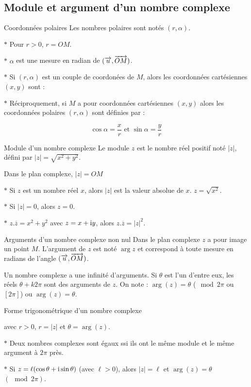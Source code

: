 \subsection{Module et argument d'un nombre complexe}

\begin{bclogo}{Coordonnées polaires}
Les nombres polaires sont notés $(r,\alpha)$. 

$\ast$ Pour $r>0$, $r=OM$.

$\ast$ $\alpha$ est une mesure en radian de $(\overrightarrow{u},\overrightarrow{OM})$.

$\ast$ Si $(r,\alpha)$ est un couple de coordonées de $M$, alors les coordonnées cartésiennes $(x,y)$ sont : 

$\ast$ Réciproquement, si $M$ a pour coordonnées cartésiennes $(x,y)$ alors les coordonnées polaires $(r,\alpha)$ sont définies par : 

\[\cos \alpha=\frac{x}{r} \text{ et } \sin \alpha=\frac{y}{r}\]
\end{bclogo}

\medskip

\begin{bclogo}{Module d'un nombre complexe}
Le module $z$ est le nombre réel positif noté $|z|$, défini par $|z|=\sqrt{x^2+y^2}$.

Dans le plan complexe, $|z|=OM$

$\ast$ Si $z$ est un nombre réel $x$, alors $|z|$ est la valeur absolue de $x$. $z=\sqrt{x^2}$.

$\ast$ Si $|z|=0$, alors $z=0$.

$\ast$ $z.\overline{z}=x^2+y^2$ avec $z=x+\mathrm{i} y$, alors $z.\overline{z}=|z|^2$.
\end{bclogo}

\medskip

\begin{bclogo}{Arguments d'un nombre complexe non nul}
Dans le plan complexe $z$ a pour image un point $M$. L'argument de $z$ est noté $\arg z$ et correspond à toute mesure en radians de l'angle $(\overrightarrow{u},\overrightarrow{OM})$.

Un nombre complexe a une infinité d'arguments. Si $\theta$ est l'un d'entre eux, les réels $\theta +k2\pi$ sont des arguments de $z$. On note : $\arg (z)=\theta$ ($\mod 2\pi$ ou $[2\pi]$) ou $\arg (z)=\theta$.
\end{bclogo}

\newpage

\begin{bclogo}{Forme trigonométrique d'un nombre complexe}

avec $r>0$, $r=|z|$ et $\theta=\arg (z)$.

$\ast$ Deux nombres complexes sont égaux ssi ils ont le même module et le même argument à $2\pi$ près.

$\ast$ Si $z=\ell (\cos \theta+\mathrm{i} \sin \theta)$ (avec $\ell >0$), alors $|z|=\ell$ et $\arg (z)=\theta$ $(\mod 2\pi)$.
\end{bclogo}


